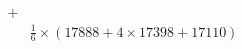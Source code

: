 \documentclass[preview]{standalone}
\begin{document}
\begin{align*}
+&\\&\frac{1}{6}\times(17888+4\times17398+17110)
\end{align*}
\end{document}
